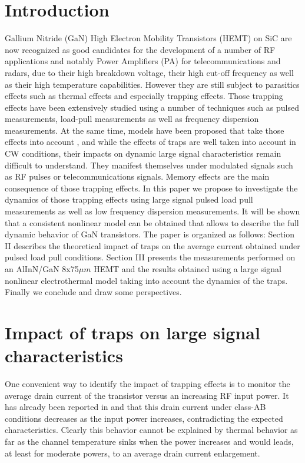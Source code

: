 \documentclass[conference]{IEEEtran}
\begin{document}
\section{Introduction}
Gallium Nitride (GaN) High Electron Mobility Transistors (HEMT) on SiC are now recognized as good candidates for the development of a number of RF applications and notably Power Amplifiers (PA) for telecommunications and radars, due to their high breakdown voltage, their high cut-off frequency as well as their high temperature capabilities. However they are still subject to parasitics effects such as thermal effects and especially trapping effects. Those trapping effects have been extensively studied using a number of techniques such as pulsed measurements, load-pull measurements as well as frequency dispersion measurements. At the same time, models have been proposed that take those effects into account \cite{5296056, Leoni2001, 5516843}, and while the effects of traps are well taken into account in CW conditions, their impacts on dynamic large signal characteristics remain difficult to understand. They manifest themselves under modulated signals such as RF pulses or telecommunications signals. Memory effects are the main consequence of those trapping effects. In this paper we propose to investigate the dynamics of those trapping effects using large signal pulsed load pull measurements as well as low frequency dispersion measurements. It will be shown that a consistent nonlinear model can be obtained that allows to describe the full dynamic behavior of GaN transistors. The paper is organized as follows: Section II describes the theoretical impact of traps on the average current obtained under pulsed load pull conditions. Section III presents the measurements performed on an AlInN/GaN 8x75$\mu m$ HEMT and the results obtained using a large signal nonlinear electrothermal model taking into account the dynamics of the traps. Finally we conclude and draw some perspectives. 



\section{Impact of traps on large signal characteristics}
One convenient way to identify the impact of trapping effects is to monitor the average drain current of the transistor versus an increasing RF input power. It has already been reported in \cite{5296056} and \cite{5516843} that this drain current under class-AB conditions decreases as the input power increases, contradicting the expected characteristics. Clearly this behavior cannot be explained by thermal behavior as far as the channel temperature sinks when the power increases and would leads, at least for moderate powers, to an average drain current enlargement. 
\end{document}
